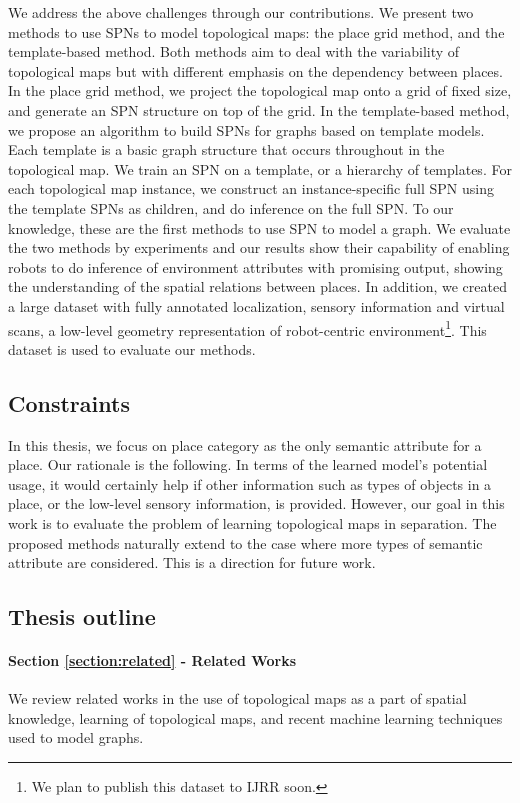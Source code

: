 \documentclass[10pt, titlepage]{article}
\theoremstyle{definition}
\begin{document}
We address the above challenges through our contributions. We present two methods to use SPNs to model topological maps: the place grid method, and the template-based method. Both methods aim to deal with the variability of topological maps but with different emphasis on the dependency between places. In the place grid method, we project the topological map onto a grid of fixed size, and generate an SPN structure on top of the grid. In the template-based method, we propose an algorithm to build SPNs for graphs based on template models. Each template is a basic graph structure that occurs throughout in the topological map. We train an SPN on a template, or a hierarchy of templates. For each topological map instance, we construct an instance-specific full SPN using the template SPNs as children, and do inference on the full SPN. To our knowledge, these are the first methods to use SPN to model a graph. We evaluate the two methods by experiments and our results show their capability of enabling robots to do inference of environment attributes with promising output, showing the understanding of the spatial relations between places. In addition, we created a large dataset with fully annotated localization, sensory information and virtual scans, a low-level geometry representation of robot-centric environment\footnote{We plan to publish this dataset to IJRR soon.}. This dataset is used to evaluate our methods.

\subsection{Constraints}
In this thesis, we focus on place category as the only semantic attribute for a place. Our rationale is the following. In terms of the learned model's potential usage, it would certainly help if other information such as types of objects in a place, or the low-level sensory information, is provided. However, our goal in this work is to evaluate the problem of learning topological maps in separation. The proposed methods naturally extend to the case where more types of semantic attribute are considered. This is a direction for future work.


\subsection{Thesis outline}

\paragraph{Section \ref{section:related} - Related Works} We review related works in the use of topological maps as a part of spatial knowledge, learning of topological maps, and recent machine learning techniques used to model graphs.
\end{document}

